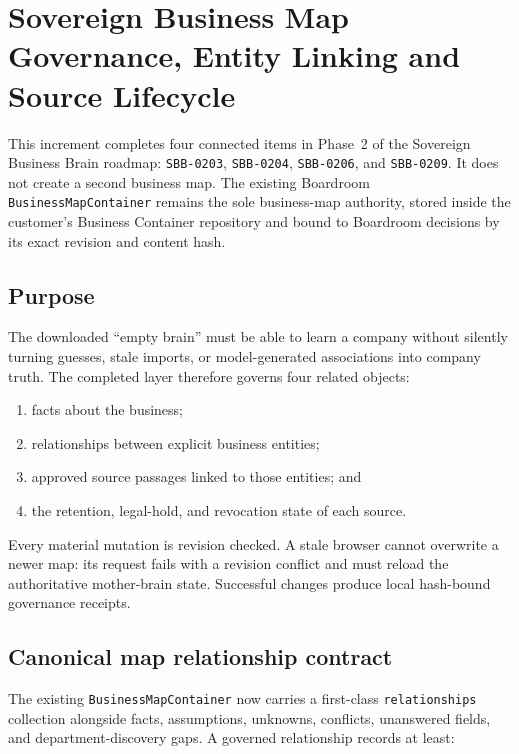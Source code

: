 \section{Sovereign Business Map Governance, Entity Linking and Source Lifecycle}
\label{sec:sovereign-business-map-governance}

This increment completes four connected items in Phase~2 of the Sovereign
Business Brain roadmap: \texttt{SBB-0203}, \texttt{SBB-0204},
\texttt{SBB-0206}, and \texttt{SBB-0209}.  It does not create a second business
map.  The existing Boardroom \texttt{BusinessMapContainer} remains the sole
business-map authority, stored inside the customer's Business Container
repository and bound to Boardroom decisions by its exact revision and content
hash.

\subsection{Purpose}

The downloaded ``empty brain'' must be able to learn a company without silently
turning guesses, stale imports, or model-generated associations into company
truth.  The completed layer therefore governs four related objects:

\begin{enumerate}
  \item facts about the business;
  \item relationships between explicit business entities;
  \item approved source passages linked to those entities; and
  \item the retention, legal-hold, and revocation state of each source.
\end{enumerate}

Every material mutation is revision checked.  A stale browser cannot overwrite
a newer map: its request fails with a revision conflict and must reload the
authoritative mother-brain state.  Successful changes produce local hash-bound
governance receipts.

\subsection{Canonical map relationship contract}

The existing \texttt{BusinessMapContainer} now carries a first-class
\texttt{relationships} collection alongside facts, assumptions, unknowns,
conflicts, unanswered fields, and department-discovery gaps.  A governed
relationship records at least:

